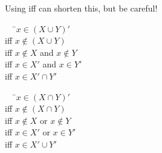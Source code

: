 \documentclass[../notes.tex]{subfiles}
\begin{document}
			Using iff can shorten this, but be careful!
			\begin{examplebox}
				\begin{tabbing}
					$\quad$ \=$x \in (X \cup Y)'$\\
					iff \>$x \notin (X \cup Y)$\\
					iff \>$x \notin X$ and $x \notin Y$\\
					iff \>$x \in X'$ and $x \in Y'$\\
					iff \>$x \in X' \cap Y'$
				\end{tabbing}
				\begin{tabbing}
					$\quad$ \=$x \in (X \cap Y)'$\\
					iff \> $x \notin (X \cap Y)$\\
					iff \> $x \notin X$ or $x \notin Y$\\
					iff \> $x \in X'$ or $x \in Y'$\\
					iff \> $x \in X' \cup Y'$
				\end{tabbing}
			\end{examplebox}
			\pagebreak
\end{document}
